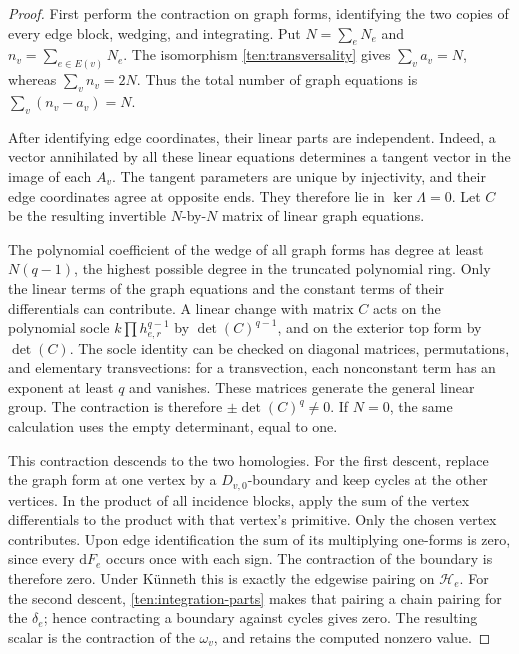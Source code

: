 \begin{proof}
First perform the contraction on graph forms, identifying the two copies
of every edge block, wedging, and integrating.  Put
\(N=\sum_eN_e\) and \(n_v=\sum_{e\in E(v)}N_e\).
The isomorphism \eqref{ten:transversality} gives \(\sum_va_v=N\), whereas
\(\sum_vn_v=2N\).  Thus the total number of graph equations is
\(\sum_v(n_v-a_v)=N\).

After identifying edge coordinates, their linear parts are independent.
Indeed, a vector annihilated by all these linear equations determines a
tangent vector in the image of each \(A_v\).  The tangent parameters are
unique by injectivity, and their edge coordinates agree at opposite
ends.  They therefore lie in \(\ker\Lambda=0\).
Let \(C\) be the resulting invertible \(N\)-by-\(N\) matrix of linear
graph equations.

The polynomial coefficient of the wedge of all graph forms has degree
at least \(N(q-1)\), the highest possible degree in the truncated
polynomial ring.  Only the linear terms of the graph equations and the
constant terms of their differentials can contribute.  A linear change
with matrix \(C\) acts on the polynomial socle
\(k\prod h_{e,r}^{q-1}\) by \(\det(C)^{q-1}\), and on the exterior top
form by \(\det(C)\).  The socle identity can be checked on diagonal
matrices, permutations, and elementary transvections: for a transvection,
each nonconstant term has an exponent at least \(q\) and vanishes.
These matrices generate the general linear group.  The contraction is
therefore \(\pm\det(C)^q\neq0\).  If \(N=0\), the same calculation uses
the empty determinant, equal to one.

This contraction descends to the two homologies.  For the first descent,
replace the graph form at one vertex by a \(D_{v,0}\)-boundary and keep
cycles at the other vertices.  In the product of all incidence blocks,
apply the sum of the vertex differentials to the product with that
vertex's primitive.  Only the chosen vertex contributes.  Upon edge
identification the sum of its multiplying one-forms is zero, since
every \(\mathrm dF_e\) occurs once with each sign.  The contraction of
the boundary is therefore zero.  Under K\"unneth this is exactly the
edgewise pairing on \(\mathcal H_e\).  For the second descent,
\eqref{ten:integration-parts} makes that pairing a chain pairing for the
\(\delta_e\); hence contracting a boundary against cycles gives zero.
The resulting scalar is the contraction of the \(\omega_v\), and retains
the computed nonzero value.
\end{proof}


